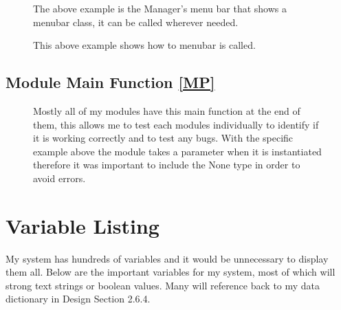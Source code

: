 \begin{figure}[H]
    \caption{The above example is the Manager's menu bar that shows a menubar class, it can be called wherever needed.} \label{fig:Dialog Class}
\end{figure}

\begin{figure}[H]
    \caption{This above example shows how to menubar is called.} \label{fig:Dialog Class}
\end{figure}

\subsection{Module Main Function \ref{MP}}
 
 \begin{figure}[H]
    \caption{Mostly all of my modules have this main function at the end of them, this allows me to test each modules individually to identify if it is working correctly and to test any bugs. With the specific example above the module takes a parameter when it is instantiated therefore it was important to include the None type in order to avoid errors.} \label{fig:Dialog Class}
\end{figure}

\section{Variable Listing}

My system has hundreds of variables and it would be unnecessary to display them all. Below are the important variables for my system, most of which will strong text strings or boolean values. Many will reference back to my data dictionary in Design Section 2.6.4.

